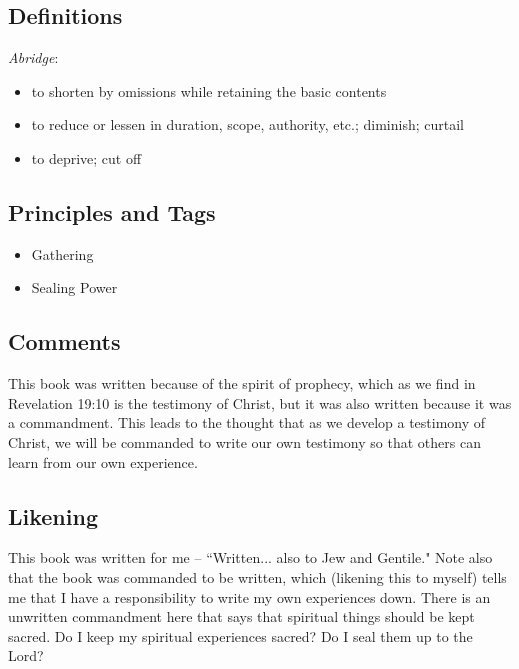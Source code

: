 \documentclass[12pt]{report}
\begin{document}
\subsection{Definitions\label{titlePage:DFN2}}
\emph{Abridge}: \begin{itemize}
\item to shorten by omissions while retaining the basic contents
\item to reduce or lessen in duration, scope, authority, etc.; diminish; curtail
\item to deprive; cut off
\end{itemize}
\subsection{Principles and Tags\label{titlePage:principles2}}
\begin{itemize}
\item {}Gathering
\item {}Sealing Power
\end{itemize}

\subsection{Comments\label{titlePage:comments2}}
This book was written because of the spirit of prophecy, which as we find in Revelation 19:10 is the testimony of Christ, but it was also written because it was a commandment.  This leads to the thought that as we develop a testimony of Christ, we will be commanded to write our own testimony so that others can learn from our own experience.

\subsection{Likening\label{titlePage:likening2}}
This book was written for me -- ``Written... also to Jew and Gentile."  Note also that the book was commanded to be written, which (likening this to myself) tells me that I have a responsibility to write my own experiences down.  There is an unwritten commandment here that says that spiritual things should be kept sacred.  Do I keep my spiritual experiences sacred?  Do I seal them up to the Lord?
\end{document}

